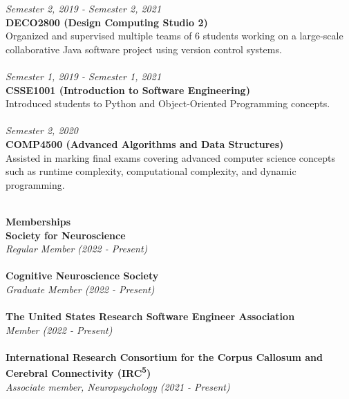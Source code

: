 \documentclass{article}
\begin{document}
  \textit{Semester 2, 2019 - Semester 2, 2021} \\
  \textbf{DECO2800 (Design Computing Studio 2)} \\
  Organized and supervised multiple teams of 6 students working on a large-scale collaborative Java software project using version control systems. \\
  \\
                      
  \textit{Semester 1, 2019 - Semester 1, 2021 } \\
  \textbf{CSSE1001 (Introduction to Software Engineering)} \\
  Introduced students to Python and Object-Oriented Programming concepts. \\
  \\
                      
  \textit{Semester 2, 2020} \\
  \textbf{COMP4500 (Advanced Algorithms and Data Structures)} \\
  Assisted in marking final exams covering advanced computer science concepts such as runtime complexity, computational complexity, and dynamic programming. \\
  \\

  \pagebreak

  \large\textbf{Memberships} \\
  \large\textbf{Society for Neuroscience} \\
  \textit{Regular Member (2022 - Present)} \\
  \\

  \large\textbf{Cognitive Neuroscience Society} \\
  \textit{Graduate Member (2022 - Present)} \\
  \\


  \large\textbf{The United States Research Software Engineer Association} \\
  \textit{Member (2022 - Present)} \\
  \\

  \large\textbf{International Research Consortium for the Corpus Callosum and Cerebral Connectivity (IRC\textsuperscript{5})} \\
  \textit{Associate member, Neuropsychology (2021 - Present)} \\ 
  \\
\end{document}
